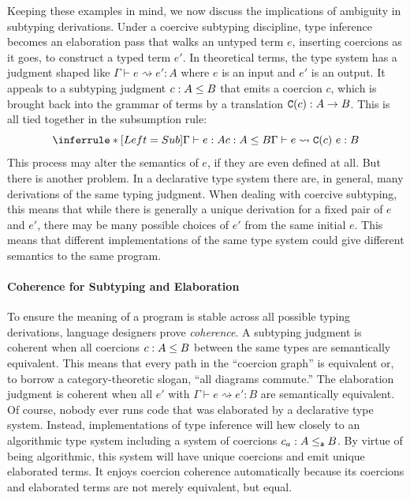 \documentclass[acmsmall,screen]{acmart}
\begin{document}
Keeping these examples in mind, we now discuss the implications of ambiguity in
subtyping derivations.
Under a coercive subtyping discipline, type inference becomes an elaboration
pass that walks an untyped term \(e\), inserting coercions as it goes, to
construct a typed term \(e'\). In theoretical terms, the type system has a
judgment shaped like \(\Gamma \vdash e \rightsquigarrow e' : A\) where \(e\) is
an input and \(e'\) is an output. It appeals to a subtyping judgment
\(c : A \leq B\) that emits a coercion \(c\), which is brought back into
the grammar of terms by a translation \(\text{\texttt{C}}(c) : A \to B\). This is all tied together
in the subsumption rule:
\[
  \inferrule*[Left=Sub]{
    \Gamma \vdash e : A\\
    c : A \subty B
  }{
    \Gamma \vdash e \rightsquigarrow \cc{c}\ e : B }
\]
This process may alter the semantics of \(e\), if they are even defined at all.
But there is another problem. In a declarative type system there are, in general,
many derivations of the same typing judgment. When dealing with coercive subtyping,
this means that while there is generally a unique derivation for a fixed pair of
\(e\) and \(e'\), there may be many possible choices of \(e'\) from the same
initial \(e\). This means that different implementations of the same type system
could give different semantics to the same program.

\paragraph{Coherence for Subtyping and Elaboration}
To ensure the meaning of a program is stable across all possible typing
derivations, language designers prove \emph{coherence}.  A subtyping judgment is
coherent when all coercions \(c : A \leq B\) between the same types are
semantically equivalent.  This means that every path in the ``coercion graph''
is equivalent or, to borrow a category-theoretic slogan, ``all diagrams
commute.'' The elaboration judgment is coherent when all \(e'\) with
\(\Gamma \vdash e \rightsquigarrow e' : B\) are semantically equivalent.
Of course, nobody ever runs code that was elaborated by a declarative type
system. Instead, implementations of type inference will hew closely to an
algorithmic type system including a system of coercions \(c_a : A \leq_{\mathsf{a}} B\).
By virtue of being algorithmic, this system will have unique coercions and emit
unique elaborated terms.  It enjoys coercion coherence automatically because
its coercions and elaborated terms are not merely equivalent, but equal.
\end{document}
